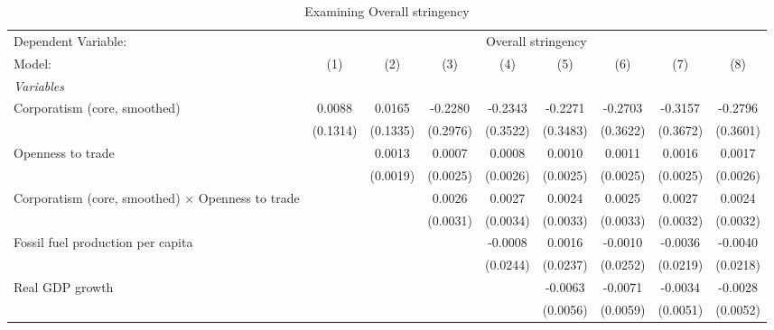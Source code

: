 
\begin{table}[htbp]
   \caption{Examining Overall stringency}
   \centering
   \begin{tabular}{lcccccccc}
      \tabularnewline \midrule \midrule
      Dependent Variable: & \multicolumn{8}{c}{Overall stringency}\\
      Model:                                                   & (1)                   & (2)      & (3)      & (4)      & (5)      & (6)      & (7)      & (8)\\  
      \midrule
      \emph{Variables}\\
      Corporatism (core, smoothed)                             & 0.0088                & 0.0165   & -0.2280  & -0.2343  & -0.2271  & -0.2703  & -0.3157  & -0.2796\\   
                                                               & (0.1314)              & (0.1335) & (0.2976) & (0.3522) & (0.3483) & (0.3622) & (0.3672) & (0.3601)\\   
      Openness to trade                                        &                       & 0.0013   & 0.0007   & 0.0008   & 0.0010   & 0.0011   & 0.0016   & 0.0017\\   
                                                               &                       & (0.0019) & (0.0025) & (0.0026) & (0.0025) & (0.0025) & (0.0025) & (0.0026)\\   
      Corporatism (core, smoothed) $\times$ Openness to trade  &                       &          & 0.0026   & 0.0027   & 0.0024   & 0.0025   & 0.0027   & 0.0024\\   
                                                               &                       &          & (0.0031) & (0.0034) & (0.0033) & (0.0033) & (0.0032) & (0.0032)\\   
      Fossil fuel production per capita                        &                       &          &          & -0.0008  & 0.0016   & -0.0010  & -0.0036  & -0.0040\\   
                                                               &                       &          &          & (0.0244) & (0.0237) & (0.0252) & (0.0219) & (0.0218)\\   
      Real GDP growth                                          &                       &          &          &          & -0.0063  & -0.0071  & -0.0034  & -0.0028\\   
                                                               &                       &          &          &          & (0.0056) & (0.0059) & (0.0051) & (0.0052)\\   

\end{tabular}
\end{table}
